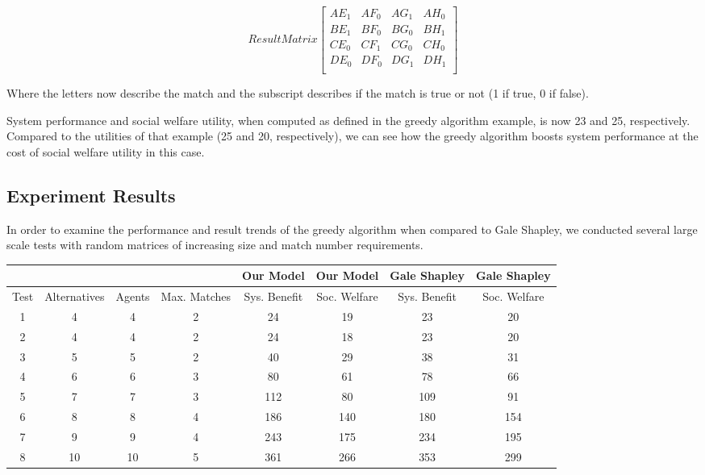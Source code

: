 \documentclass[11pt, letterpaper]{article}
\begin{document}
	\[
	Result Matrix
	\begin{bmatrix}
		AE_{1} & AF_{0} & AG_{1} & AH_{0} \\
		BE_{1} & BF_{0} & BG_{0} & BH_{1} \\
		CE_{0} & CF_{1} & CG_{0} & CH_{0} \\
		DE_{0} & DF_{0} & DG_{1} & DH_{1} \\
	\end{bmatrix}
	\]

	Where the letters now describe the match and the subscript describes if the match is true or not (1 if true, 0 if false).

	System performance and social welfare utility, when computed as defined in the greedy algorithm example, is now 23 and 25, respectively.  Compared to the utilities of that example (25 and 20, respectively), we can see how the greedy algorithm boosts system performance at the cost of social welfare utility in this case.

\subsection{Experiment Results}
In order to examine the performance and result trends of the greedy algorithm when compared to Gale Shapley, we conducted several large scale tests with random matrices of increasing size and match number requirements.  

	\begin{center}
		\begin{tabular}{ | c c c c | c c | c c | }
		 & & & & Our Model & Our Model & Gale Shapley & Gale Shapley \\
		 \hline
		Test & Alternatives & Agents & Max. Matches & Sys. Benefit & Soc. Welfare & Sys. Benefit & Soc. Welfare \\
		\hline
		1 & 4 & 4 & 2 & 24 & 19 & 23 & 20\\
		2 & 4 & 4 & 2 & 24 & 18 & 23 & 20\\
		3 & 5 & 5 & 2 & 40 & 29 & 38 & 31\\
		4 & 6 & 6 & 3 & 80 & 61 & 78 & 66\\
		5 & 7 & 7 & 3 & 112 & 80 & 109 & 91\\
		6 & 8 & 8 & 4 & 186 & 140 & 180 & 154\\
		7 & 9 & 9 & 4 & 243 & 175 & 234 & 195\\
		8 & 10 & 10 & 5 & 361 & 266 & 353 & 299\\
		\hline
		\end{tabular}
	\end{center}
\end{document}
